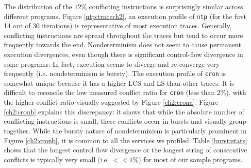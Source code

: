 The distribution of the $12\%$ conflicting instructions
is surprisingly similar across different programs.
Figure \ref{ntp:tracech2}, an execution profile of \texttt{ntp}
(for the first 14 out of 30 iterations) is representative
of most execution traces. Generally,
conflicting instructions are spread throughout
the traces but tend to occur more frequently
towards the end. Nondeterminism does not seem to cause permanent 
execution divergences, even though there is significant
control-flow divergence in some programs. In fact, execution seems to
diverge and re-converge very frequently (i.e. nondeterminism is bursty).
The execution profile of \texttt{cron} is somewhat unique
because it has a higher LCS and LS than other traces. It is
difficult to reconcile the low measured conflict ratio for \texttt{cron} (less
than $2\%$), with the higher conflict ratio visually suggested by 
Figure \ref{ch2:crona}. Figure \ref{ch2:cronb} 
explains this discrepancy: it shows that while
the absolute number of conflicting instructions is small,
these conflicts occur in bursts and visually group together. 
While the bursty nature of nondeterminism
is particularly prominent in Figure \ref{ch2:cronb},
it is common to all the services we profiled. Table \ref{burst:stats}
shows that the longest control flow divergence 
or the longest string of consecutive conflicts
is typically very small (i.e. $<<1\%$) 
for most of our sample programs.


